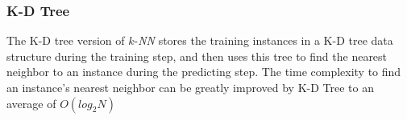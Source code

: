 		\subsubsection{K-D Tree}
		The K-D tree version of $k$-\textit{NN} stores the training instances in a K-D tree data structure during the training step, and then uses this tree to find the nearest neighbor to an instance during the predicting step. The time complexity to find an instance's nearest neighbor can be greatly improved by K-D Tree to an average of $O(log_2N)$
